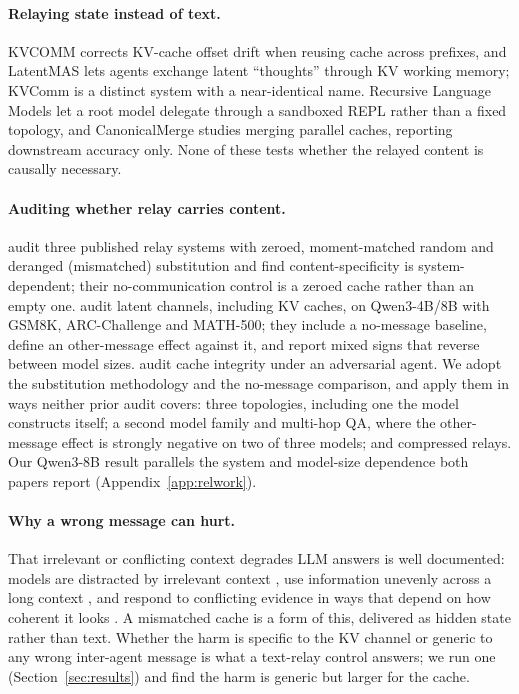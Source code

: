\documentclass[11pt]{article}
\begin{document}
\paragraph{Relaying state instead of text.} KVCOMM \citep{kvcomm2025}
corrects KV-cache offset drift when reusing cache across prefixes, and
LatentMAS \citep{latentmas2026} lets agents exchange latent ``thoughts''
through KV working memory; KVComm \citep{shikvcomm2025} is a distinct
system with a near-identical name. Recursive Language Models
\citep{rlm2026} let a root model delegate through a sandboxed REPL
rather than a fixed topology, and CanonicalMerge
\citep{canonicalmerge2026} studies merging parallel caches, reporting
downstream accuracy only. None of these tests whether the relayed
content is causally necessary.

\paragraph{Auditing whether relay carries content.}
\citet{latentcommpay2026} audit three published relay systems with zeroed,
moment-matched random and deranged (mismatched) substitution and find
content-specificity is system-dependent; their no-communication control is a
zeroed cache rather than an empty one. \citet{zhangemu2026} audit latent
channels, including KV caches, on Qwen3-4B/8B with GSM8K, ARC-Challenge and
MATH-500; they include a no-message baseline, define an other-message effect
against it, and report mixed signs that reverse between model sizes.
\citet{latentagentslie2026} audit cache integrity under an adversarial agent.
We adopt the substitution methodology and the no-message comparison, and apply
them in ways neither prior audit covers: three topologies, including one the
model constructs itself; a second model family and multi-hop QA, where the
other-message effect is strongly negative on two of three models; and
compressed relays. Our Qwen3-8B result parallels the system and model-size
dependence both papers report (Appendix~\ref{app:relwork}).

\paragraph{Why a wrong message can hurt.} That irrelevant or conflicting
context degrades LLM answers is well documented: models are distracted by
irrelevant context \citep{shi2023distracted}, use information unevenly across a
long context \citep{liu2024lost}, and respond to conflicting evidence in ways
that depend on how coherent it looks \citep{xie2024knowledgeconflicts}. A
mismatched cache is a form of this, delivered as hidden state rather than
text. Whether the harm is specific to the KV channel or generic to any wrong
inter-agent message is what a text-relay control answers; we run one
(Section~\ref{sec:results}) and find the harm is generic but larger for the cache.
\end{document}
